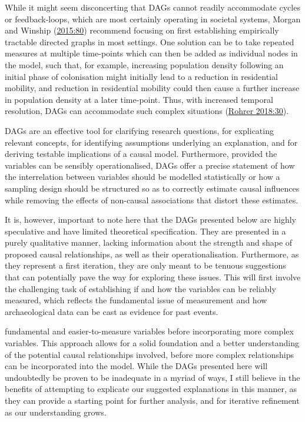 \documentclass[
  12pt,
  a4paper,
  oneside]{book}
\begin{document}
While it might seem disconcerting that DAGs cannot readily accommodate cycles or feedback-loops, which are most certainly operating in societal systems, Morgan and Winship (\protect\hyperlink{ref-morgan2015}{2015:80}) recommend focusing on first establishing empirically tractable directed graphs in most settings. One solution can be to take repeated measures at multiple time-points which can then be added as individual nodes in the model, such that, for example, increasing population density following an initial phase of colonisation might initially lead to a reduction in residential mobility, and reduction in residential mobility could then cause a further increase in population density at a later time-point. Thus, with increased temporal resolution, DAGs can accommodate such complex situations (\protect\hyperlink{ref-rohrer2018}{Rohrer 2018:30}).

DAGs are an effective tool for clarifying research questions, for explicating relevant concepts, for identifying assumptions underlying an explanation, and for deriving testable implications of a causal model. Furthermore, provided the variables can be sensibly operationalised, DAGs offer a precise statement of how the interrelation between variables should be modelled statistically or how a sampling design should be structured so as to correctly estimate causal influences while removing the effects of non-causal associations that distort these estimates.

It is, however, important to note here that the DAGs presented below are highly speculative and have limited theoretical specification. They are presented in a purely qualitative manner, lacking information about the strength and shape of proposed causal relationships, as well as their operationalisation. Furthermore, as they represent a first iteration, they are only meant to be tenuous suggestions that can potentially pave the way for exploring these issues. This will first involve the challenging task of establishing if and how the variables can be reliably measured, which reflects the fundamental issue of measurement and how archaeological data can be cast as evidence for past events.

fundamental and easier-to-measure variables before incorporating more complex variables. This approach allows for a solid foundation and a better understanding of the potential causal relationships involved, before more complex relationships can be incorporated into the model. While the DAGs presented here will undoubtedly be proven to be inadequate in a myriad of ways, I still believe in the benefits of attempting to explicate our suggested explanations in this manner, as they can provide a starting point for further analysis, and for iterative refinement as our understanding grows.
\end{document}
